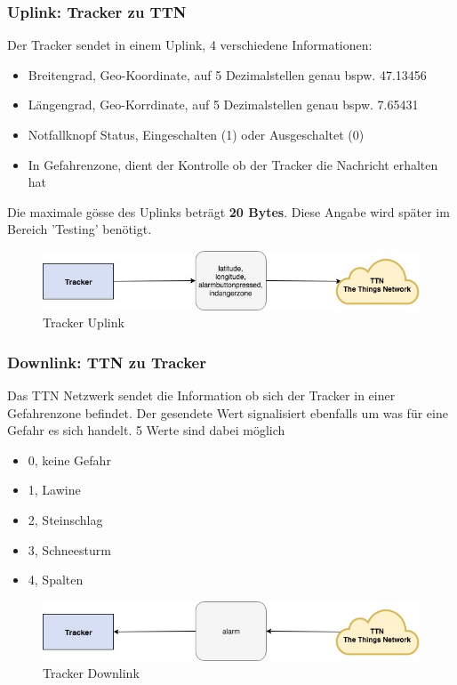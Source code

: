 \documentclass[11pt,english,german]{report}
\theoremstyle{definition}
\begin{document}
\subsubsection{Uplink: Tracker zu TTN}
Der Tracker sendet in einem Uplink, 4 verschiedene Informationen:
\begin{itemize}
	\item Breitengrad, Geo-Koordinate, auf 5 Dezimalstellen genau bspw. 47.13456
	\item Längengrad, Geo-Korrdinate, auf 5 Dezimalstellen genau bspw. 7.65431
	\item Notfallknopf Status, Eingeschalten (1) oder Ausgeschaltet (0)
	\item In Gefahrenzone, dient der Kontrolle ob der Tracker die Nachricht erhalten hat
\end{itemize}
Die maximale gösse des Uplinks beträgt \textbf{20 Bytes}. Diese Angabe wird später im Bereich 'Testing' benötigt.
\begin{figure}[H]
	\centering
	\includegraphics[width=\textwidth]{img/system/dataflow_tracker2ttn_uplink.jpg}
	\caption[Tracker Uplink]
	{Tracker Uplink}
\end{figure}

\subsubsection{Downlink: TTN zu Tracker}
Das TTN Netzwerk sendet die Information ob sich der Tracker in einer Gefahrenzone befindet. Der gesendete Wert signalisiert ebenfalls um was für eine Gefahr es sich handelt. 5 Werte sind dabei möglich
\begin{itemize}
	\item 0, keine Gefahr
	\item 1, Lawine
	\item 2, Steinschlag
	\item 3, Schneesturm
	\item 4, Spalten
\end{itemize}

\begin{figure}[H]
	\centering
	\includegraphics[width=\textwidth]{img/system/dataflow_tracker2ttn_downlink.jpg}
	\caption[Tracker Downlink]
	{Tracker Downlink}
\end{figure}
\end{document}
